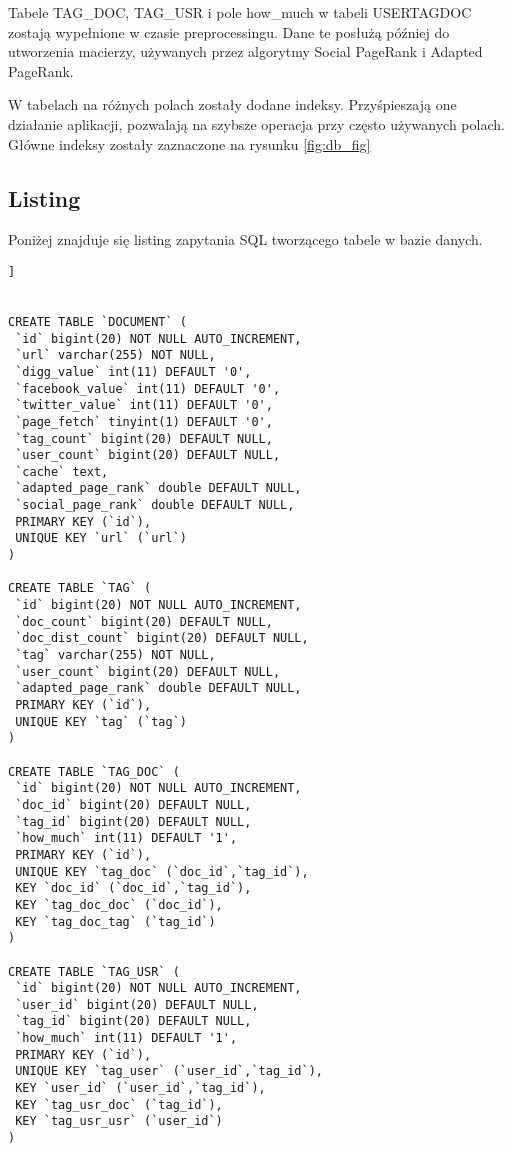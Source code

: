 Tabele TAG\_DOC, TAG\_USR i pole how\_much w tabeli USERTAGDOC zostają wypełnione w czasie preprocessingu. Dane te posłużą  później do utworzenia macierzy, używanych przez algorytmy Social PageRank i Adapted PageRank. 


W tabelach na różnych polach zostały dodane indeksy. Przyśpieszają one działanie aplikacji, pozwalają na szybsze operacja przy często używanych polach. Główne indeksy zostały zaznaczone na rysunku \ref{fig:db_fig}

\subsection{Listing}
Poniżej znajduje się listing zapytania SQL tworzącego tabele w bazie danych.

\lstset{language=SQL}  
\begin{lstlisting}[frame=lines, caption={Skrypt tworzący tabele w bazie danych}, label={sql_all}] ]


CREATE TABLE `DOCUMENT` (
 `id` bigint(20) NOT NULL AUTO_INCREMENT,
 `url` varchar(255) NOT NULL,
 `digg_value` int(11) DEFAULT '0',
 `facebook_value` int(11) DEFAULT '0',
 `twitter_value` int(11) DEFAULT '0',
 `page_fetch` tinyint(1) DEFAULT '0',
 `tag_count` bigint(20) DEFAULT NULL,
 `user_count` bigint(20) DEFAULT NULL,
 `cache` text,
 `adapted_page_rank` double DEFAULT NULL,
 `social_page_rank` double DEFAULT NULL,
 PRIMARY KEY (`id`),
 UNIQUE KEY `url` (`url`)
) 

CREATE TABLE `TAG` (
 `id` bigint(20) NOT NULL AUTO_INCREMENT,
 `doc_count` bigint(20) DEFAULT NULL,
 `doc_dist_count` bigint(20) DEFAULT NULL,
 `tag` varchar(255) NOT NULL,
 `user_count` bigint(20) DEFAULT NULL,
 `adapted_page_rank` double DEFAULT NULL,
 PRIMARY KEY (`id`),
 UNIQUE KEY `tag` (`tag`)
)

CREATE TABLE `TAG_DOC` (
 `id` bigint(20) NOT NULL AUTO_INCREMENT,
 `doc_id` bigint(20) DEFAULT NULL,
 `tag_id` bigint(20) DEFAULT NULL,
 `how_much` int(11) DEFAULT '1',
 PRIMARY KEY (`id`),
 UNIQUE KEY `tag_doc` (`doc_id`,`tag_id`),
 KEY `doc_id` (`doc_id`,`tag_id`),
 KEY `tag_doc_doc` (`doc_id`),
 KEY `tag_doc_tag` (`tag_id`)
) 

CREATE TABLE `TAG_USR` (
 `id` bigint(20) NOT NULL AUTO_INCREMENT,
 `user_id` bigint(20) DEFAULT NULL,
 `tag_id` bigint(20) DEFAULT NULL,
 `how_much` int(11) DEFAULT '1',
 PRIMARY KEY (`id`),
 UNIQUE KEY `tag_user` (`user_id`,`tag_id`),
 KEY `user_id` (`user_id`,`tag_id`),
 KEY `tag_usr_doc` (`tag_id`),
 KEY `tag_usr_usr` (`user_id`)
)


\end{lstlisting}
